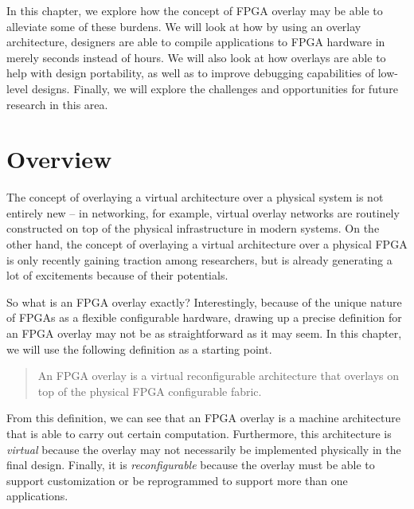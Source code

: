 In this chapter, we explore how the concept of FPGA overlay may be able to alleviate some of these burdens.
We will look at how by using an overlay architecture, designers are able to compile applications to FPGA hardware in merely seconds instead of hours.
We will also look at how overlays are able to help with design portability, as well as to improve debugging capabilities of low-level designs.
Finally, we will explore the challenges and opportunities for future research in this area.


\section{Overview}
%
The concept of overlaying a virtual architecture over a physical system is not entirely new -- in networking, for example, virtual overlay networks are routinely constructed on top of the physical infrastructure in modern systems.
On the other hand, the concept of overlaying a virtual architecture over a physical FPGA is only recently gaining traction among researchers, but is already generating a lot of excitements because of their potentials.



So what is an FPGA overlay exactly?
Interestingly, because of the unique nature of FPGAs as a flexible configurable hardware, drawing up a precise definition for an FPGA overlay may not be as straightforward as it may seem. 
In this chapter, we will use the following definition as a starting point.

\begin{quote}
An FPGA overlay is a virtual reconfigurable architecture that overlays on top of the physical FPGA configurable fabric.
\end{quote}

From this definition, we can see that an FPGA overlay is a machine architecture that is able to carry out certain computation.  Furthermore, this architecture is \emph{virtual} because the overlay may not necessarily be implemented physically in the final design.  Finally, it is \emph{reconfigurable} because the overlay must be able to support customization or be reprogrammed to support more than one applications.

